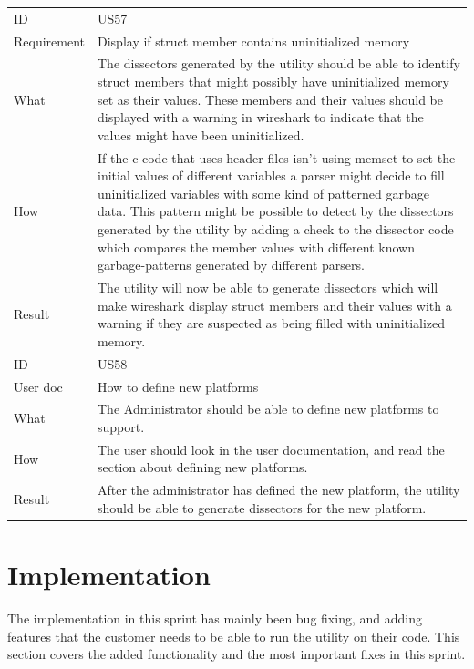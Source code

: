 \begin{table}[htbp]
{\begin{tabularx}{1.2\textwidth}{l X}
	\midrule
	ID & US57 \\
	Requirement & Display if \gls{struct} \gls{member} contains uninitialized memory \\
	What & The \glspl{dissector} generated by the \gls{utility} should be able to identify \gls{struct} \glspl{member} that might possibly have uninitialized memory set as their values.
 	These \glspl{member} and their values should be displayed with a warning in \Gls{wireshark} to indicate that the values might have been uninitialized.  \\
	How & If the \Gls{c}-code that uses \gls{header} files isn’t using memset to set the initial values of different variables a \gls{parser} might decide to fill uninitialized variables with some kind of patterned garbage data.
 	This pattern might be possible to detect by the \glspl{dissector} generated by the \gls{utility} by adding a check to the \gls{dissector} code which compares the \gls{member} values with different known garbage-patterns generated by different \glspl{parser}. \\
	Result & The \gls{utility} will now be able to generate \glspl{dissector} which will make \Gls{wireshark} display \gls{struct} \glspl{member} and their values with a warning if they are suspected as being filled with uninitialized memory. \\	
	\midrule
	ID & US58 \\
	User doc & How to define new platforms \\
	What & The Administrator should be able to define new platforms to support.  \\
	How & The user should look in the user documentation, and read the section about defining new platforms. \\
	Result & After the administrator has defined the new platform, the \gls{utility} should be able to generate \glspl{dissector} for the new platform. \\	
	\bottomrule
\end{tabularx}}
\end{table}

\section{Implementation}
\label{sec:sp4impl}
The implementation in this sprint has mainly been bug fixing, and adding 
features that the customer needs to be able to run the \gls{utility} on their code. 
This section covers the added functionality and the most important fixes 
in this sprint.

